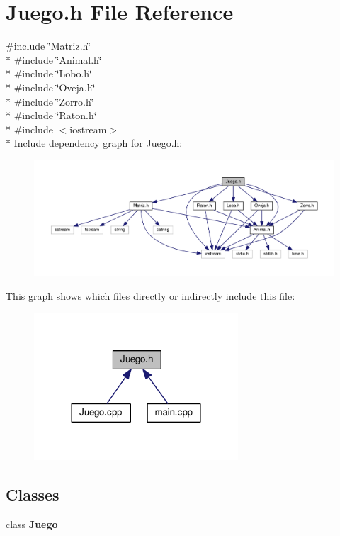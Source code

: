 \section{Juego.\-h File Reference}
\label{_juego_8h}
{\ttfamily \#include \char`\"{}Matriz.\-h\char`\"{}}\\*
{\ttfamily \#include \char`\"{}Animal.\-h\char`\"{}}\\*
{\ttfamily \#include \char`\"{}Lobo.\-h\char`\"{}}\\*
{\ttfamily \#include \char`\"{}Oveja.\-h\char`\"{}}\\*
{\ttfamily \#include \char`\"{}Zorro.\-h\char`\"{}}\\*
{\ttfamily \#include \char`\"{}Raton.\-h\char`\"{}}\\*
{\ttfamily \#include $<$iostream$>$}\\*
Include dependency graph for Juego.\-h\-:
\nopagebreak
\begin{figure}[H]
\begin{center}
\leavevmode
\includegraphics[width=350pt]{_juego_8h__incl}
\end{center}
\end{figure}
This graph shows which files directly or indirectly include this file\-:
\nopagebreak
\begin{figure}[H]
\begin{center}
\leavevmode
\includegraphics[width=216pt]{_juego_8h__dep__incl}
\end{center}
\end{figure}
\subsection*{Classes}
\begin{DoxyCompactItemize}
\item 
class {\bf Juego}
\end{DoxyCompactItemize}
